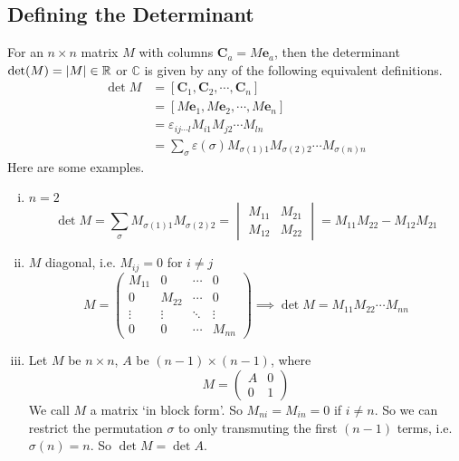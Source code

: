 \documentclass{article}
\begin{document}
\subsection{Defining the Determinant}
For an $n \times n$ matrix $M$ with columns $\bm C_a = M\bm e_a$, then the determinant $\det(M) = \abs{M} \in \mathbb R$ or $\mathbb C$ is given by any of the following equivalent definitions.
\begin{align*}
	\det M
	 & = [\bm C_1, \bm C_2, \cdots, \bm C_n]                                                \\
	 & = [M\bm e_1, M\bm e_2, \cdots, M\bm e_n]                                             \\
	 & = \varepsilon_{ij\cdots l}M_{i1}M_{j2} \cdots M_{ln}                                 \\
	 & = \sum_\sigma \varepsilon(\sigma) M_{\sigma(1)1}M_{\sigma(2)2} \cdots M_{\sigma(n)n}
\end{align*}
Here are some examples.
\begin{enumerate}[(i)]
	\item $n=2$
	      \[ \det M = \sum_\sigma M_{\sigma(1)1}M_{\sigma(2)2} = \begin{vmatrix}
			      M_{11} & M_{21} \\ M_{12} & M_{22}
		      \end{vmatrix} = M_{11}M_{22} - M_{12}M_{21} \]
	\item $M$ diagonal, i.e. $M_{ij} = 0$ for $i \neq j$
	      \[ M = \begin{pmatrix}
			      M_{11} & 0      & \cdots & 0      \\
			      0      & M_{22} & \cdots & 0      \\
			      \vdots & \vdots & \ddots & \vdots \\
			      0      & 0      & \cdots & M_{nn}
		      \end{pmatrix} \implies \det M = M_{11}M_{22}\cdots M_{nn} \]
	\item Let $M$ be $n\times n$, $A$ be $(n-1) \times (n-1)$, where
	      \[ M = \left( \begin{array}{c|c}
				      A & 0 \\\hline
				      0 & 1
			      \end{array} \right) \]
	      We call $M$ a matrix `in block form'. So $M_{ni} = M_{in} = 0$ if $i \neq n$. So we can restrict the permutation $\sigma$ to only transmuting the first $(n-1)$ terms, i.e. $\sigma(n) = n$. So $\det M = \det A$.
\end{enumerate}
\end{document}
